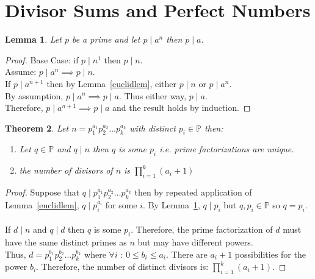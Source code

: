 \documentclass[12pt]{extarticle}
\renewcommand\qedsymbol{$\square$}
\newcommand{\divides}{\mid}
\newcommand{\Primes}{\mathbb{P}}
\newtheorem{theorem}{Theorem}[section]
\newtheorem{lemma}[theorem]{Lemma}
\newenvironment{lproof}{\begin{proof} \renewcommand{\qedsymbol}{}}{\end{proof}}
\begin{document}
\section{Divisor Sums and Perfect Numbers}

\begin{lemma}
\label{primepowdivision}
Let $p$ be a prime and let $p \divides a^n$ then $p \divides a$.
\end{lemma}

\begin{lproof}
Base Case: if $p \divides n^1$ then $p \divides n$. \\
Assume: $p \divides a^n \implies p \divides n$. \\ 
If $p \divides a^{n+1}$ then by Lemma~\ref{euclidlem}, either $p \divides n$ or $p \divides a^n$.\\ 
By assumption, $p \divides a^n \implies p \divides a$. Thus either way, $p \divides a$. \\
Therefore, $p \divides a^{n+1} \implies p \divides a$ and the result holds by induction.
\end{lproof}

\begin{theorem}
Let $n = p_1^{a_1}   p_2^{a_2}   \dots   p_k^{a_k}$ with distinct $p_i \in \Primes$ then:
\begin{enumerate}
\item Let $q \in \Primes$ and $q \divides n$ then $q$ is some $p_i$ i.e. prime factorizations are unique.
\item the number of divisors of $n$ is $\prod\limits_{i=1}^{k} (a_i+1)$
\end{enumerate}
\end{theorem}

\begin{proof}
Suppose that $q \divides p_1^{a_1}   p_2^{a_2}   \dots   p_k^{a_k}$ then by repeated application of Lemma~\ref{euclidlem}, $q \divides p_i^{a_i}$ for some $i$. By Lemma~\ref{primepowdivision}, $q \divides p_i$ but $q, p_i \in \Primes$ so $q = p_i$. 
\\\\
If $d \divides n$ and $q \divides d$ then $q$ is some $p_i$. Therefore, the prime factorization of $d$ must have the same distinct primes as $n$ but may have different powers. \\ Thus, $d = p_1^{b_1}   p_2^{b_2}   \dots   p_k^{b_k}$ where $\forall i$ : $ 0 \le b_i \le a_i$. There are $a_i + 1$ possibilities for the power $b_i$. Therefore, the number of distinct divisors is: $\prod\limits_{i=1}^{k} (a_i+1)$.  
\end{proof}
\end{document}
